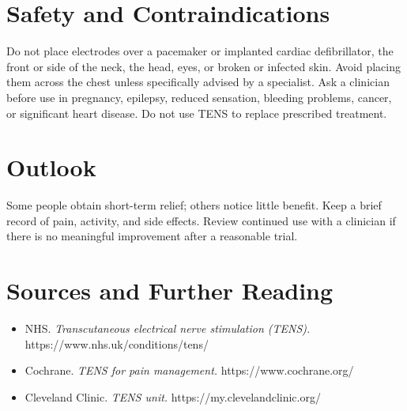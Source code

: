 \section*{Safety and Contraindications}
Do not place electrodes over a pacemaker or implanted cardiac defibrillator, the front or side of the neck, the head, eyes, or broken or infected skin. Avoid placing them across the chest unless specifically advised by a specialist. Ask a clinician before use in pregnancy, epilepsy, reduced sensation, bleeding problems, cancer, or significant heart disease. Do not use TENS to replace prescribed treatment.

\section*{Outlook}
Some people obtain short-term relief; others notice little benefit. Keep a brief record of pain, activity, and side effects. Review continued use with a clinician if there is no meaningful improvement after a reasonable trial.

\section*{Sources and Further Reading}
\begin{itemize}
    \item NHS. \textit{Transcutaneous electrical nerve stimulation (TENS).} https://www.nhs.uk/conditions/tens/
    \item Cochrane. \textit{TENS for pain management.} https://www.cochrane.org/
    \item Cleveland Clinic. \textit{TENS unit.} https://my.clevelandclinic.org/
\end{itemize}
